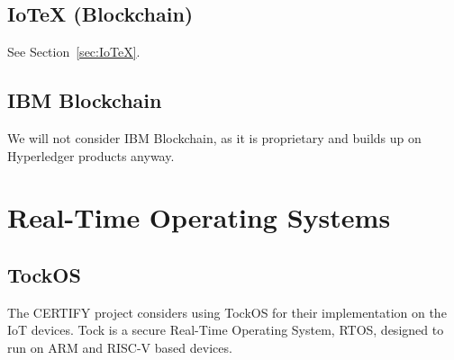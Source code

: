 \subsection{IoTeX (Blockchain)} %
\label{sub:IoTeX-Blockchain}
See Section~\ref{sec:IoTeX}.

\subsection{IBM Blockchain} %
\label{sub:IBM-Blockchain}
We will not consider IBM Blockchain, as it is proprietary and builds up on Hyperledger products anyway.



\section{Real-Time Operating Systems} %
\label{sec:Real-Time Operating Systems}

\subsection{TockOS} %
\label{sub:TockOS}

The CERTIFY project considers using TockOS for their implementation on the IoT devices.
Tock is a secure Real-Time Operating System, RTOS, designed to run on ARM and RISC-V based devices.

